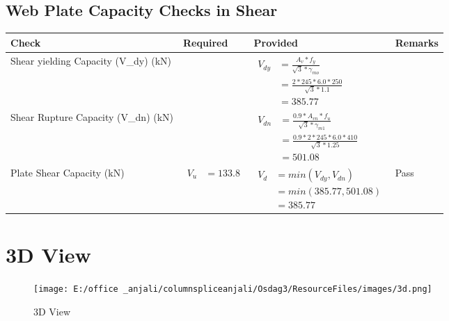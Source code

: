 \documentclass{article}%
\begin{document}
\subsection{Web Plate Capacity Checks in Shear}%
\label{subsec:WebPlateCapacityChecksinShear}%
\renewcommand{\arraystretch}{1.2}%
\begin{longtable}{|p{4cm}|p{6cm}|p{5.5cm}|p{1.5cm}|}%
\hline%
\rowcolor{OsdagGreen}%
Check&Required&Provided&Remarks\\%
\hline%
\endhead%
\hline%
Shear yielding Capacity (V\_dy) (kN)&&$\begin{aligned} V_{dy} &= \frac{A_v*f_y}{\sqrt{3}*\gamma_{mo}}\\ &=\frac{2*245*6.0*250}{\sqrt{3}*1.1}\\ &=385.77\end{aligned}$&\\%
\hline%
Shear Rupture Capacity (V\_dn) (kN)&&$\begin{aligned} V_{dn} &= \frac{0.9*A_{vn}*f_u}{\sqrt{3}*\gamma_{m1}}\\ &=\frac{0.9*2*245*6.0*410}{\sqrt{3}*1.25}\\ &=501.08\end{aligned}$&\\%
\hline%
Plate Shear Capacity (kN)&$\begin{aligned} V_u &=133.8\end{aligned}$&$\begin{aligned} V_d &= min(V_{dy},V_{dn})\\ &= min(385.77,501.08)\\ &=385.77\end{aligned}$&Pass\\%
\hline%
\end{longtable}

%
%
\newpage%
\section{3D View}%
\label{sec:3DView}%


\begin{figure}[h!]%
\centering%
\texttt{[image: E:/office \_anjali/columnspliceanjali/Osdag3/ResourceFiles/images/3d.png]}%
\caption{3D View}%
\end{figure}

%
\end{document}
